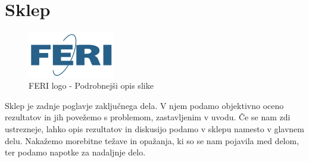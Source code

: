\chapter{Sklep}

\begin{figure}[h!]
	\centering
	\includegraphics[height=2cm]{Slike/feri_logo.pdf}
	\caption[FERI logo - Naslov v kazalu slik]{FERI logo - Podrobnejši opis slike}
\end{figure}

Sklep je zadnje poglavje zaključnega dela. V njem podamo objektivno oceno rezultatov in jih povežemo s problemom, zastavljenim v uvodu. Če se nam zdi ustrezneje, lahko opis rezultatov in diskusijo podamo v sklepu namesto v glavnem delu. Nakažemo morebitne težave in opažanja, ki so se nam pojavila med delom, ter podamo napotke za nadaljnje delo.